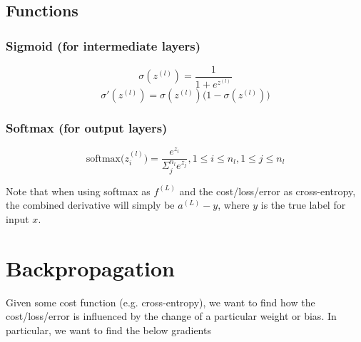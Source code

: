 \documentclass[12pt]{article}
\begin{document}
\subsection*{Functions}
\subsubsection*{Sigmoid (for intermediate layers)}
\begin{equation*}
    \sigma(z^{(l)}) = \frac{1}{1+e^{z^{(l)}}}
\end{equation*}
\begin{equation*}
    \sigma'(z^{(l)}) = \sigma(z^{(l)})\big( 1-\sigma(z^{(l)}) \big)
\end{equation*}

\subsubsection*{Softmax (for output layers)}
\begin{equation*}
    \text{softmax}\big(z^{(l)}_i \big) = \frac{e^{z_i}}{\Sigma_j^{n_l} e^{z_j}}, 1 \leq i \leq n_l, 1 \leq j \leq n_l
\end{equation*}

\noindent
Note that when using softmax as $f^{(L)}$ and the cost/loss/error as cross-entropy, the combined derivative will simply be $a^{(L)} - y$, where $y$ is the true label for input $x$.

\newpage

\section*{Backpropagation}
Given some cost function (e.g. cross-entropy), we want to find how the cost/loss/error is influenced by the change of a particular weight or bias. In particular, we want to find the below gradients
\end{document}
